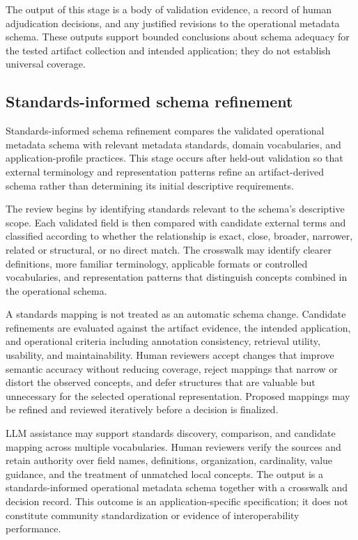 \documentclass{article}
\begin{document}
The output of this stage is a body of validation evidence, a record of human adjudication decisions, and any justified revisions to the operational metadata schema. These outputs support bounded conclusions about schema adequacy for the tested artifact collection and intended application; they do not establish universal coverage.

\subsection{Standards-informed schema refinement}
\label{sec:standards_refinement_methodology}

Standards-informed schema refinement compares the validated operational metadata schema with relevant metadata standards, domain vocabularies, and application-profile practices. This stage occurs after held-out validation so that external terminology and representation patterns refine an artifact-derived schema rather than determining its initial descriptive requirements.

The review begins by identifying standards relevant to the schema's descriptive scope. Each validated field is then compared with candidate external terms and classified according to whether the relationship is exact, close, broader, narrower, related or structural, or no direct match. The crosswalk may identify clearer definitions, more familiar terminology, applicable formats or controlled vocabularies, and representation patterns that distinguish concepts combined in the operational schema.

A standards mapping is not treated as an automatic schema change. Candidate refinements are evaluated against the artifact evidence, the intended application, and operational criteria including annotation consistency, retrieval utility, usability, and maintainability. Human reviewers accept changes that improve semantic accuracy without reducing coverage, reject mappings that narrow or distort the observed concepts, and defer structures that are valuable but unnecessary for the selected operational representation. Proposed mappings may be refined and reviewed iteratively before a decision is finalized.

LLM assistance may support standards discovery, comparison, and candidate mapping across multiple vocabularies. Human reviewers verify the sources and retain authority over field names, definitions, organization, cardinality, value guidance, and the treatment of unmatched local concepts. The output is a standards-informed operational metadata schema together with a crosswalk and decision record. This outcome is an application-specific specification; it does not constitute community standardization or evidence of interoperability performance.
\end{document}
